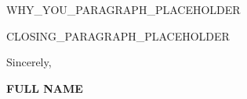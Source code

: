 \documentclass[10pt, letterpaper]{article}
\begin{document}
WHY_YOU_PARAGRAPH_PLACEHOLDER

\vspace{8pt}


CLOSING_PARAGRAPH_PLACEHOLDER

\vspace{16pt}

Sincerely,

\vspace{24pt}

\textbf{FULL NAME}

%

\end{document}
